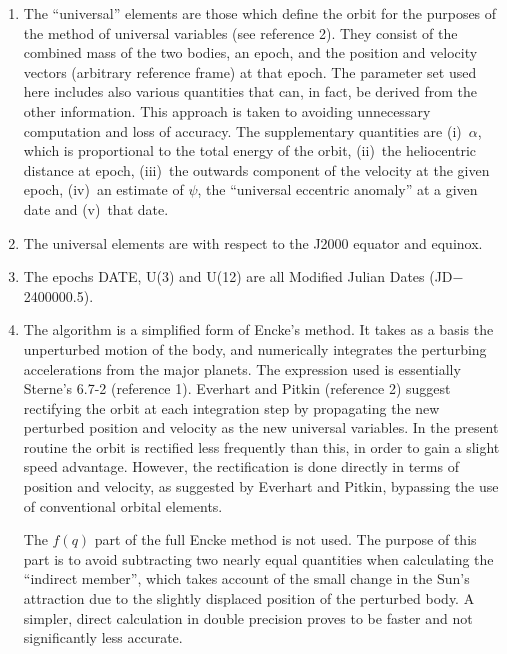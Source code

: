 \documentclass[11pt,twoside]{article}
\begin{document}
{
 \begin{enumerate}
  \setlength{\parskip}{\medskipamount}
  \item The ``universal'' elements are those which define the orbit for the
        purposes of the method of universal variables (see reference 2).
        They consist of the combined mass of the two bodies, an epoch,
        and the position and velocity vectors (arbitrary reference frame)
        at that epoch.  The parameter set used here includes also various
        quantities that can, in fact, be derived from the other
        information.  This approach is taken to avoiding unnecessary
        computation and loss of accuracy.  The supplementary quantities
        are (i)~$\alpha$, which is proportional to the total energy of the
        orbit, (ii)~the heliocentric distance at epoch,
        (iii)~the outwards component of the velocity at the given epoch,
        (iv)~an estimate of $\psi$, the ``universal eccentric anomaly'' at a
        given date and (v)~that date.
  \item The universal elements are with respect to the J2000 equator and
        equinox.
  \item The epochs DATE, U(3) and U(12) are all Modified Julian Dates
        (JD$-$2400000.5).
  \item The algorithm is a simplified form of Encke's method.  It takes as
        a basis the unperturbed motion of the body, and numerically
        integrates the perturbing accelerations from the major planets.
        The expression used is essentially Sterne's 6.7-2 (reference 1).
        Everhart and Pitkin (reference 2) suggest rectifying the orbit at
        each integration step by propagating the new perturbed position
        and velocity as the new universal variables.  In the present
        routine the orbit is rectified less frequently than this, in order
        to gain a slight speed advantage.  However, the rectification is
        done directly in terms of position and velocity, as suggested by
        Everhart and Pitkin, bypassing the use of conventional orbital
        elements.

        The $f(q)$ part of the full Encke method is not used.  The purpose
        of this part is to avoid subtracting two nearly equal quantities
        when calculating the ``indirect member'', which takes account of the
        small change in the Sun's attraction due to the slightly displaced
        position of the perturbed body.  A simpler, direct calculation in
        double precision proves to be faster and not significantly less
        accurate.


\end{enumerate}}
\end{document}
